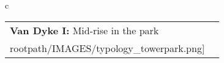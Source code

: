 \begin{table}[H]
        \begin{tabular}{c}
        \begin{tabular}{m{1.5in} m{2in}}
\textbf{Van Dyke I:} {Mid-rise in the park} & \texttt{[image: \\rootpath/IMAGES/typology\_towerpark.png]}
\end{tabular}\end{tabular}
        \end{table}